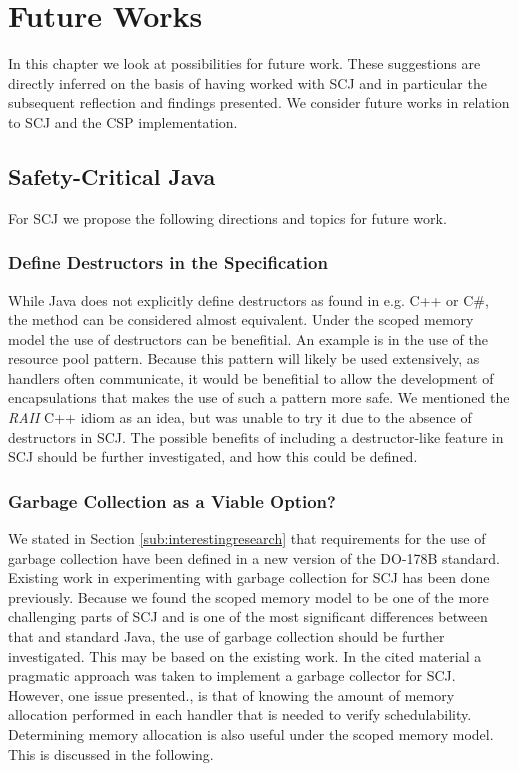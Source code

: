 \chapter{Future Works}
\label{chapter:FutureWorks}
In this chapter we look at possibilities for future work. These suggestions are directly inferred on the basis of having worked with SCJ and in particular the subsequent reflection and findings presented. We consider future works in relation to SCJ and the CSP implementation.

\section{Safety-Critical Java} %
\label{sec:scjfuture}
For SCJ we propose the following directions and topics for future work.

\subsection{Define Destructors in the Specification}
While Java does not explicitly define destructors as found in e.g. C++ or C\#, the  method can be considered almost equivalent. Under the scoped memory model the use of destructors can be benefitial. An example is in the use of the resource pool pattern. Because this pattern will likely be used extensively, as handlers often communicate, it would be benefitial to allow the development of encapsulations that makes the use of such a pattern more safe. We mentioned the \textit{RAII} C++ idiom as an idea, but was unable to try it due to the absence of destructors in SCJ. The possible benefits of including a destructor-like feature in SCJ should be further investigated, and how this could be defined.

\subsection{Garbage Collection as a Viable Option?} %
\label{sub:garbage_collection_as_a_viable_option}
We stated in Section \ref{sub:interestingresearch} that requirements for the use of garbage collection have been defined in a new version of the DO-178B standard. Existing work in experimenting with garbage collection for SCJ has been done previously\cite{Schoeberl:2007:GCS:1288940.1288953}. Because we found the scoped memory model to be one of the more challenging parts of SCJ and is one of the most significant differences between that and standard Java, the use of garbage collection should be further investigated. This may be based on the existing work. In the cited material a pragmatic approach was taken to implement a garbage collector for SCJ. However, one issue presented., is that of knowing the amount of memory allocation performed in each handler that is needed to verify schedulability. Determining memory allocation is also useful under the scoped memory model. This is discussed in the following.

